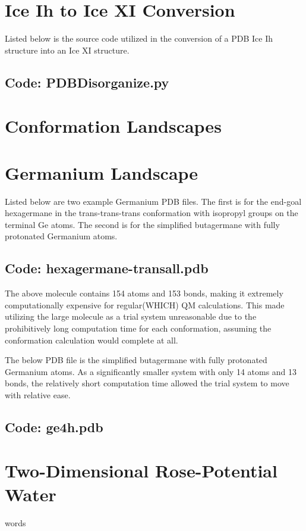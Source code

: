 \chapter{Ice Ih to Ice XI Conversion}
\label{ch:App:CrystalDisorg}

Listed below is the source code utilized in the conversion of a PDB Ice Ih structure into an Ice XI structure.

\section{Code: PDBDisorganize.py}


\chapter{Conformation Landscapes}
\label{ch:App:ConfLand}


\chapter{Germanium Landscape}
\label{ch:App:GermLand}

Listed below are two example Germanium PDB files. The first is for the end-goal hexagermane in the trans-trans-trans conformation with isopropyl groups on the terminal Ge atoms. The second is for the simplified butagermane with fully protonated Germanium atoms.

\section{Code: hexagermane-transall.pdb}


The above molecule contains 154 atoms and 153 bonds, making it extremely computationally expensive for regular(WHICH) QM calculations. This made utilizing the large molecule as a trial system unreasonable due to the prohibitively long computation time for each conformation, assuming the conformation calculation would complete at all.

The below PDB file is the simplified butagermane with fully protonated Germanium atoms. As a significantly smaller system with only 14 atoms and 13 bonds, the relatively short computation time allowed the trial system to move with relative ease.

\section{Code: ge4h.pdb}


\chapter{Two-Dimensional Rose-Potential Water}

words
